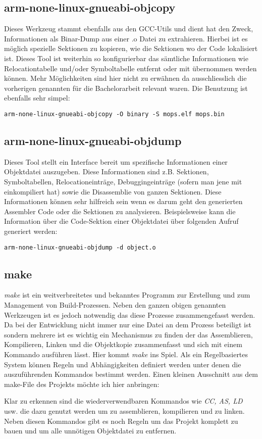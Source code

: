 \subsection{arm-none-linux-gnueabi-objcopy}
\label{tools:copy}
Dieses Werkzeug stammt ebenfalls aus den GCC-Utils und dient hat den Zweck, Informationen als Binar-Dump aus einer .o Datei zu extrahieren. Hierbei ist es m\"oglich spezielle Sektionen zu kopieren, wie die Sektionen wo der Code lokalisiert ist. Dieses Tool ist weiterhin so konfigurierbar das s\"amtliche Informationen wie Relocationtabelle und/oder Symboltabelle entfernt oder mit \"ubernommen werden k\"onnen. Mehr M\"oglichkeiten sind hier nicht zu erw\"ahnen da ausschliesslich die vorherigen genannten f\"ur die Bachelorarbeit relevant waren. Die Benutzung ist ebenfalls sehr simpel:
\begin{lstlisting}[caption={Objektkopie in Bin\"arformat}]
arm-none-linux-gnueabi-objcopy -O binary -S mops.elf mops.bin
\end{lstlisting}

\subsection{arm-none-linux-gnueabi-objdump}
Dieses Tool stellt ein Interface bereit um spezifische Informationen einer Objektdatei auszugeben. Diese Informationen sind z.B. Sektionen, Symboltabellen, Relocationeintr\"age, Debuggingeintr\"age (sofern man jene mit einkompiliert hat) sowie die Disassemblie von ganzen Sektionen. Diese Informationen k\"onnen sehr hilfreich sein wenn es darum geht den generierten Assembler Code oder die Sektionen zu analysieren. Beispielsweise kann die Information \"uber die Code-Sektion einer Objektdatei \"uber folgenden Aufruf generiert werden:
\begin{lstlisting}[caption={Objdump einer Objektdatei}]
arm-none-linux-gnueabi-objdump -d object.o
\end{lstlisting}
\subsection{make}
\textit{make} ist ein weitverbreitetes und bekanntes Programm zur Erstellung und zum Management von Build-Prozessen. Neben den ganzen obigen genannten Werkzeugen ist es jedoch notwendig das diese Prozesse zusammengefasst werden. Da bei der Entwicklung nicht immer nur eine Datei an dem Prozess beteiligt ist sondern mehrere ist es wichtig ein Mechanismus zu finden der das Assemblieren, Kompilieren, Linken und die Objektkopie zusammenfasst und sich mit einem Kommando ausf\"uhren l\"asst. Hier kommt \textit{make} ins Spiel. Als ein Regelbasiertes System k\"onnen Regeln und Abh\"angigkeiten definiert werden unter denen die auszuf\"uhrenden Kommandos bestimmt werden. Einen kleinen Ausschnitt aus dem make-File des Projekts m\"ochte ich hier anbringen:

Klar zu erkennen sind die wiederverwendbaren Kommandos wie \textit{CC, AS, LD} usw. die dazu genutzt werden um zu assemblieren, kompilieren und zu linken. Neben diesen Kommandos gibt es noch Regeln um das Projekt komplett zu bauen und um alle unn\"otigen Objektdatei zu entfernen.

